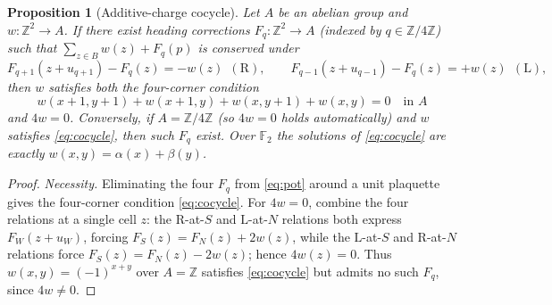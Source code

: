 \documentclass[11pt,letterpaper]{article}
\theoremstyle{plain}
\newtheorem{proposition}[theorem]{Proposition}
\theoremstyle{definition}
\newcommand{\Z}{\mathbb{Z}}
\newcommand{\F}{\mathbb{F}}
\newcommand{\turnR}{\mathrm{R}}
\newcommand{\turnL}{\mathrm{L}}
\begin{document}
\begin{NoHyper}
\begin{proposition}[Additive-charge cocycle]\label{prop:cocycle}
Let $A$ be an abelian group and $w:\Z^2\to A$. If there exist heading corrections
$F_q:\Z^2\to A$ (indexed by $q\in\Z/4\Z$) such that $\sum_{z\in B}w(z)+F_q(p)$ is
conserved under
\begin{equation}\label{eq:pot}
F_{q+1}(z+u_{q+1})-F_q(z)=-w(z)\ \ (\turnR),\qquad
F_{q-1}(z+u_{q-1})-F_q(z)=+w(z)\ \ (\turnL),
\end{equation}
then $w$ satisfies both the four-corner condition
\begin{equation}\label{eq:cocycle}
w(x{+}1,y{+}1)+w(x{+}1,y)+w(x,y{+}1)+w(x,y)=0\quad\text{in }A
\end{equation}
and $4w=0$. Conversely, if $A=\Z/4\Z$ \emph{(}so $4w=0$ holds automatically\emph{)}
and $w$ satisfies \eqref{eq:cocycle}, then such $F_q$ exist. Over $\F_2$ the solutions
of \eqref{eq:cocycle} are exactly $w(x,y)=\alpha(x)+\beta(y)$.
\end{proposition}

\begin{proof}
\emph{Necessity.} Eliminating the four $F_q$ from \eqref{eq:pot} around a unit
plaquette gives the four-corner condition \eqref{eq:cocycle}. For $4w=0$, combine the
four relations at a single cell $z$: the $\turnR$-at-$S$ and $\turnL$-at-$N$ relations
both express $F_W(z+u_W)$, forcing $F_S(z)=F_N(z)+2w(z)$, while the $\turnL$-at-$S$ and
$\turnR$-at-$N$ relations force $F_S(z)=F_N(z)-2w(z)$; hence $4w(z)=0$. Thus
$w(x,y)=(-1)^{x+y}$ over $A=\Z$ satisfies \eqref{eq:cocycle} but admits no such $F_q$,
since $4w\neq0$.


\end{proof}
\end{NoHyper}
\end{document}
